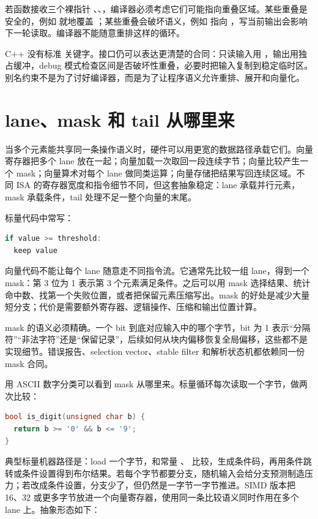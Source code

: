 若函数接收三个裸指针 、、，编译器必须考虑它们可能指向重叠区域。某些重叠是安全的，例如  就地覆盖 ；某些重叠会破坏语义，例如  指向 ，写当前输出会影响下一轮读取。编译器不能随意重排这样的循环。

C++ 没有标准  关键字。接口仍可以表达更清楚的合同：只读输入用 ，输出用独占缓冲，debug 模式检查区间是否破坏性重叠，必要时把输入复制到稳定临时区。别名约束不是为了讨好编译器，而是为了让程序语义允许重排、展开和向量化。

\section{lane、mask 和 tail 从哪里来}

当多个元素能共享同一条操作语义时，硬件可以用更宽的数据路径承载它们。向量寄存器把多个 lane 放在一起；向量加载一次取回一段连续字节；向量比较产生一个 mask；向量算术对每个 lane 做同类运算；向量存储把结果写回连续区域。不同 ISA 的寄存器宽度和指令细节不同，但这套抽象稳定：lane 承载并行元素，mask 承载条件，tail 处理不足一整个向量的末尾。

标量代码中常写：

\begin{lstlisting}[language=C++,caption={标量条件的语义}]
if value >= threshold:
  keep value
\end{lstlisting}

向量代码不能让每个 lane 随意走不同指令流。它通常先比较一组 lane，得到一个 mask：第 3 位为 1 表示第 3 个元素满足条件。之后可以用 mask 选择结果、统计命中数、找第一个失败位置，或者把保留元素压缩写出。mask 的好处是减少大量短分支；代价是需要额外寄存器、逻辑操作、压缩和输出位置计算。

mask 的语义必须精确。一个 bit 到底对应输入中的哪个字节，bit 为 1 表示“分隔符”“非法字符”还是“保留记录”，后续如何从块内偏移恢复全局偏移，这些都不是实现细节。错误报告、selection vector、stable filter 和解析状态机都依赖同一份 mask 合同。

用 ASCII 数字分类可以看到 mask 从哪里来。标量循环每次读取一个字节，做两次比较：

\begin{lstlisting}[language=C++,caption={标量数字分类}]
bool is_digit(unsigned char b) {
  return b >= '0' && b <= '9';
}
\end{lstlisting}

典型标量机器路径是：load 一个字节，和常量 、 比较，生成条件码，再用条件跳转或条件设置得到布尔结果。若每个字节都要分支，随机输入会给分支预测制造压力；若改成条件设置，分支少了，但仍然是一字节一字节推进。SIMD 版本把 16、32 或更多字节放进一个向量寄存器，使用同一条比较语义同时作用在多个 lane 上。抽象形态如下：

